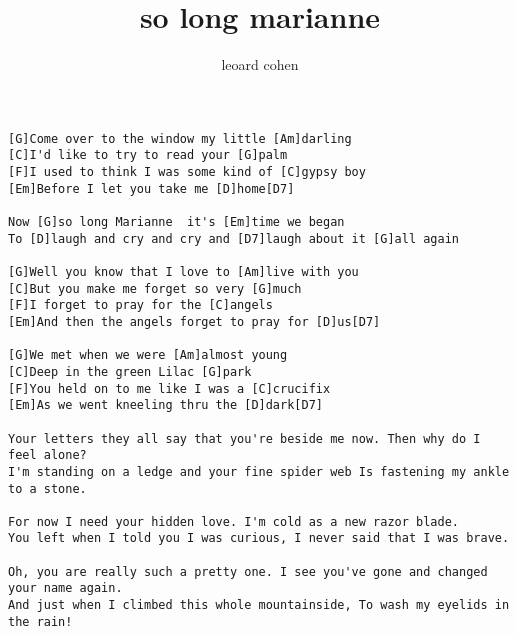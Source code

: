 \author{leoard cohen}
\title{so long marianne}
\maketitle
\begin{verbatim}
[G]Come over to the window my little [Am]darling
[C]I'd like to try to read your [G]palm
[F]I used to think I was some kind of [C]gypsy boy
[Em]Before I let you take me [D]home[D7]

Now [G]so long Marianne  it's [Em]time we began
To [D]laugh and cry and cry and [D7]laugh about it [G]all again

[G]Well you know that I love to [Am]live with you
[C]But you make me forget so very [G]much
[F]I forget to pray for the [C]angels
[Em]And then the angels forget to pray for [D]us[D7]

[G]We met when we were [Am]almost young
[C]Deep in the green Lilac [G]park
[F]You held on to me like I was a [C]crucifix
[Em]As we went kneeling thru the [D]dark[D7]

Your letters they all say that you're beside me now. Then why do I feel alone?
I'm standing on a ledge and your fine spider web Is fastening my ankle to a stone.

For now I need your hidden love. I'm cold as a new razor blade.
You left when I told you I was curious, I never said that I was brave.

Oh, you are really such a pretty one. I see you've gone and changed your name again.
And just when I climbed this whole mountainside, To wash my eyelids in the rain!
\end{verbatim}